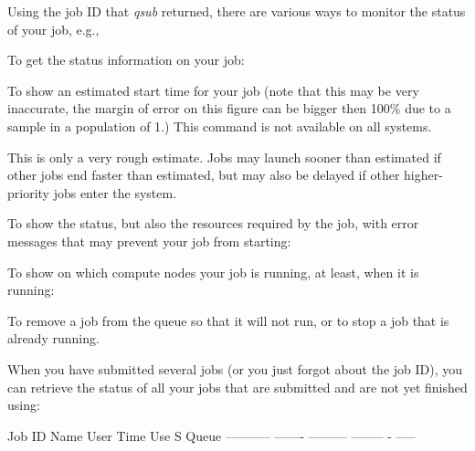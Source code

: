 Using the job ID that \textit{qsub} returned, there are various ways to monitor
the status of your job, e.g.,

To get the status information on your job:

\begin{prompt}
\end{prompt}

\ifgent
\else
\ifbrussel
\else
  To show an estimated start time for your job (note that this may be very inaccurate,
  the margin of error on this figure can be bigger then 100\% due to a sample in a
  population of 1.)
  This command is not available on all systems.

\begin{prompt}
\end{prompt}

  This is only a very rough estimate. Jobs may launch sooner than estimated if
  other jobs end faster than estimated, but may also be delayed if other
  higher-priority jobs enter the system.

  To show the status, but also the resources required by the job, with error
  messages that may prevent your job from starting:

\begin{prompt}
\end{prompt}
\fi
\fi

To show on which compute nodes your job is running, at least, when it is
running:

\begin{prompt}
\end{prompt}

To remove a job from the queue so that it will not run, or to stop a job that
is already running.

\begin{prompt}
\end{prompt}

When you have submitted several jobs (or you just forgot about the job ID), you
can retrieve the status of all your jobs that are submitted and are not yet
finished using:

\begin{prompt}
Job ID      Name    User      Time Use S Queue
----------- ------- --------- -------- - -----
\end{prompt}

